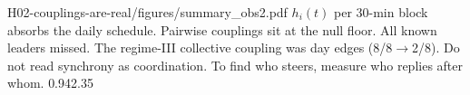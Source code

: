 {H02-couplings-are-real/figures/summary_obs2.pdf}
{$h_i(t)$ per 30-min block absorbs the daily schedule.}
{Pairwise couplings sit at the null floor. All known leaders missed. The regime-III collective coupling was day edges (8/8$\to$2/8).}
{Do not read synchrony as coordination. To find who steers, measure who replies after whom.}
{0.94}{2.35}
